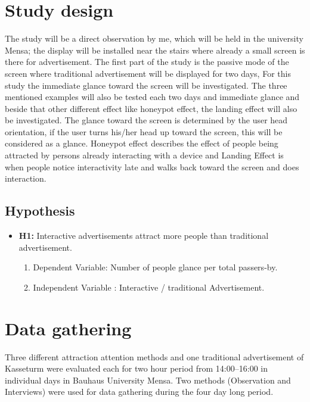 \section{Study design}

The study will be a direct observation by me, which will be held in the university Mensa; the display will be installed near the stairs where already a small screen is there for advertisement. The first part of the study is the passive mode of the screen where traditional advertisement will be displayed for two days, For this study the immediate glance toward the screen will be investigated. The three mentioned examples will also be tested each two days and immediate glance and beside that other different effect like honeypot effect, the landing effect will also be investigated. The glance toward the screen is determined by the user head orientation, if the user turns his/her head up toward the screen, this will be considered as a glance. Honeypot effect \cite{EnticingPeople} describes the effect of people being attracted by persons already interacting with a device and Landing Effect \cite{LookingGlass}  is when people notice interactivity late and walks back toward the screen and does interaction.


\subsection{Hypothesis}


\begin{itemize}
\item \textbf{H1:} Interactive advertisements attract more people than traditional advertisement.
	
	\begin{enumerate}
		\item Dependent Variable: Number of people glance per total passers-by.
		\item Independent Variable : Interactive / traditional Advertisement.
	\end{enumerate}
		
\end{itemize}



\section{Data gathering}
Three different attraction attention methods and one traditional advertisement of Kasseturm were evaluated each for two hour period from 14:00--16:00 in individual days in Bauhaus University Mensa. Two methods (Observation and Interviews) were used for data gathering during the four day long period.

